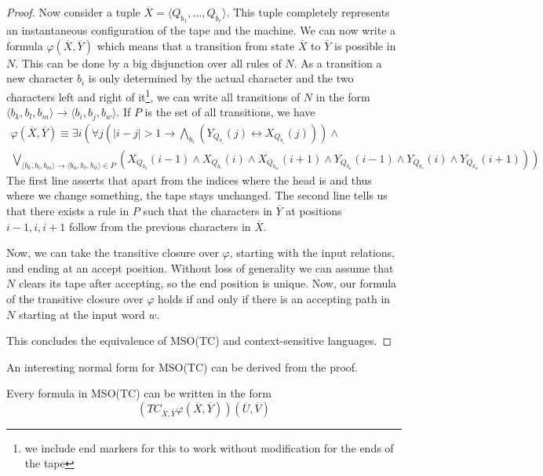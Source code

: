 \begin{proof}
    Now consider a tuple $\overline{X} = \langle Q_{b_1}, \dots, Q_{b_r} \rangle$.
    This tuple completely represents an instantaneous configuration of the tape and the machine.
    We can now write a formula $\varphi(\overline{X}, \overline{Y})$ which means that a transition from state $\overline{X}$ to $\overline{Y}$ is possible in $N$.
    This can be done by a big disjunction over all rules of $N$.
    As a transition a new character $b_i$ is only determined by the actual character and the two characters left and right of it\footnote{we include end markers for this to work without modification for the ends of the tape}, we can write all transitions of $N$ in the form $\langle b_{k},b_{l},b_{m}\rangle \to \langle b_{i}, b_{j}, b_{w} \rangle$.
    If $P$ is the set of all transitions, we have
    \begin{multline*}
        \varphi(\overline{X}, \overline{Y}) \equiv \exists i \left(\forall j \left(|i - j| > 1 \to \bigwedge_{b_i}\left(Y_{Q_{b_i}}(j) \leftrightarrow X_{Q_{b_i}}(j)\right)\right) \land \right. \\
        \left. \bigvee_{\langle b_{k},b_{l},b_{m}\rangle \to \langle b_{u}, b_{v}, b_{w} \rangle \in P} \left(X_{Q_{b_{k}}}(i - 1) \land X_{Q_{b_{l}}}(i) \land X_{Q_{b_{m}}}(i + 1) \land Y_{Q_{b_{u}}}(i - 1) \land Y_{Q_{b_{v}}}(i) \land Y_{Q_{b_{w}}}(i + 1) \right)\right)
    \end{multline*}
    The first line asserts that apart from the indices where the head is and thus where we change something, the tape stays unchanged.
    The second line tells us that there exists a rule in $P$ such that the characters in $\overline{Y}$ at positions $i - 1, i, i + 1$ follow from the previous characters in $\overline{X}$.

    Now, we can take the transitive closure over $\varphi$, starting with the input relations, and ending at an accept position.
    Without loss of generality we can assume that $N$ clears its tape after accepting, so the end position is unique.
    Now, our formula of the transitive closure over $\varphi$ holds if and only if there is an accepting path in $N$ starting at the input word $w$.

    This concludes the equivalence of MSO(TC) and context-sensitive languages.
\end{proof}

An interesting normal form for MSO(TC) can be derived from the proof.
\begin{corollary}
    Every formula in MSO(TC) can be written in the form
    \[
        \left( TC_{\overline{X}, \overline{Y}} \varphi(\overline{X}, \overline{Y}) \right)\left( \overline{U}, \overline{V} \right)
    \]
\end{corollary}

